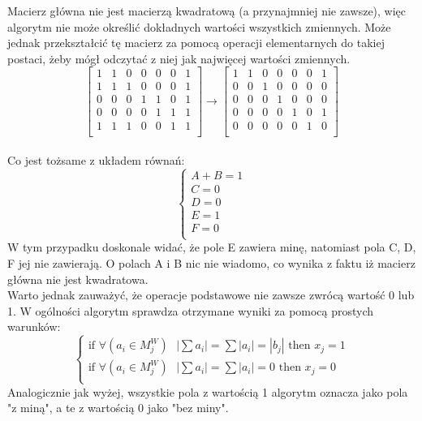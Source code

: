 \documentclass[letterpaper,12pt]{article}
\begin{document}
Macierz główna nie jest macierzą kwadratową (a przynajmniej nie zawsze), 
więc algorytm nie może określić dokładnych wartości wszystkich zmiennych. Może jednak 
przekształcić tę macierz za pomocą operacji elementarnych do takiej postaci, żeby
mógł odczytać z niej jak najwięcej wartości zmiennych. \\
\[
\left[
\begin{array}{cccccc|c}
    1 & 1 & 0 & 0 & 0 & 0 & 1\\
    1 & 1 & 1 & 0 & 0 & 0 & 1\\
    0 & 0 & 0 & 1 & 1 & 0 & 1 \\
    0 & 0 & 0 & 0 & 1 & 1 & 1\\
    1 & 1 & 1 & 0 & 0 & 1 & 1\\
\end{array}
\right]
\longrightarrow
\left[
\begin{array}{cccccc|c}
    1 & 1 & 0 & 0 & 0 & 0 & 1\\
    0 & 0 & 1 & 0 & 0 & 0 & 0\\
    0 & 0 & 0 & 1 & 0 & 0 & 0 \\
    0 & 0 & 0 & 0 & 1 & 0 & 1\\
    0 & 0 & 0 & 0 & 0 & 1 & 0\\
\end{array}
\right]
\] \\
Co jest tożsame z układem równań:\\
$$
\begin{cases}
 A + B = 1 \\
 C = 0 \\
 D = 0 \\
 E = 1 \\
 F = 0 \\
\end{cases}
$$
\hfill \break
W tym przypadku doskonale widać, że pole E zawiera minę, natomiast pola C, D, F jej nie zawierają. 
O polach A i B nic nie wiadomo, co wynika z faktu iż macierz główna nie jest kwadratowa. \\
Warto jednak zauważyć, że operacje podstawowe nie zawsze zwrócą wartość 0 lub 1. W ogólności
algorytm sprawdza otrzymane wyniki za pomocą prostych warunków: \\
$$
\begin{cases}
 \text{if } \forall{(a_{i} \in M_{j}^W)} \text{ } |\sum{a_{i}}| = \sum{|a_{i}| = |b_{j}|}  \text{ then } x_{j}=1 \\
 \text{if } \forall{(a_{i} \in M_{j}^W)} \text{ } |\sum{a_{i}}| = \sum{|a_{i}|} = 0 \text{ then } x_{j}=0 \\
\end{cases}
$$
\hfill \break
Analogicznie jak wyżej, wszystkie pola z wartością 1 algorytm oznacza jako pola "z miną", a te z wartością 0 jako "bez miny".
\end{document}
